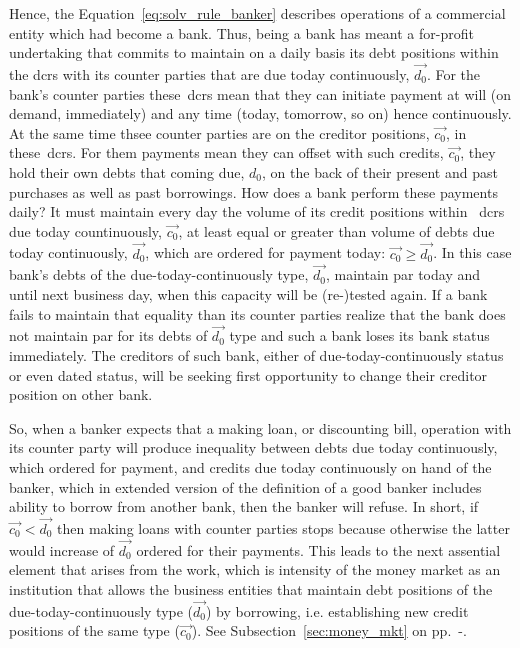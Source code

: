 Hence, the Equation~\ref{eq:solv_rule_banker} describes operations of a commercial entity which had become a bank. Thus, being a bank has meant a for-profit undertaking that commits to maintain on a daily basis its debt positions within the \acfp{dcr} with its counter parties that are due today continuously, $\overrightarrow{d_0}$. For the bank's counter parties these~\acp{dcr} mean that they can initiate payment at will (on demand, immediately) and any time (today, tomorrow, so on) hence continuously. At the same time thsee counter parties are on the creditor positions, $\overrightarrow{c_0}$, in these~\acp{dcr}. For them payments mean they can offset with such credits, $\overrightarrow{c_0}$, they hold their own debts that coming due, $d_0$, on the back of their present and past purchases as well as past borrowings. How does a bank perform these payments daily? It must maintain every day the volume of its credit positions within ~\acp{dcr} due today countinuously, $\overrightarrow{c_0}$, at least equal or greater than volume of debts due today continuously, $\overrightarrow{d_0}$, which are ordered for payment today: $\overrightarrow{c_0} \geq \overrightarrow{d_0}$. In this case bank's debts of the due-today-continuously type, $\overrightarrow{d_0}$, maintain par today and until next business day, when this capacity will be (re-)tested again. If a bank fails to maintain that equality than its counter parties realize that the bank does not maintain par for its debts of $\overrightarrow{d_0}$ type and such a bank loses its bank status immediately. The creditors of such bank, either of due-today-continuously status or even dated status, will be seeking first opportunity to change their creditor position on other bank.

So, when a banker expects that a making loan, or discounting bill, operation with its counter party will produce inequality between debts due today continuously, which ordered for payment, and credits due today continuously on hand of the banker, which in extended version of the \citeauthor{innes1913} definition of a good banker includes ability to borrow from another bank, then the banker will refuse. In short, if $\overrightarrow{c_0} < \overrightarrow{d_0}$ then making loans with counter parties stops because otherwise the latter would increase of $\overrightarrow{d_0}$ ordered for their payments. This leads to the next assential element that arises from the \citeauthor{innes1913} work, which is intensity of the money market as an institution that allows the business entities that maintain debt positions of the due-today-continuously type ($\overrightarrow{d_0}$) by borrowing, i.e. establishing new credit positions of the same type ($\overrightarrow{c_0}$). See Subsection~\ref{sec:money_mkt} on pp.~\pageref{sec:money_mkt}-\pageref{sec:medium_of_exchange}.

